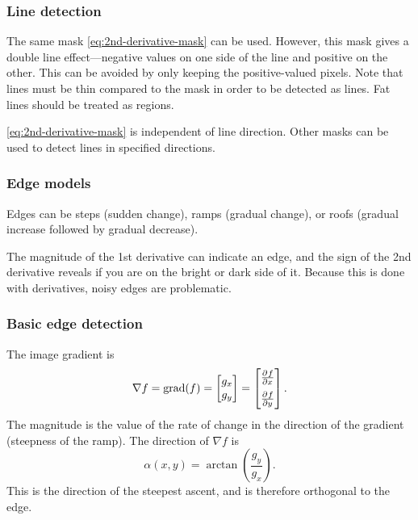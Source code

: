 \subsubsection{Line detection}
The same mask \eqref{eq:2nd-derivative-mask} can be used. However, this mask gives a double line effect---negative values on one side of the line and positive on the other. This can be avoided by only keeping the positive-valued pixels. Note that lines must be thin compared to the mask in order to be detected as lines. Fat lines should be treated as regions.

\eqref{eq:2nd-derivative-mask} is independent of line direction. Other masks can be used to detect lines in specified directions.

\subsubsection{Edge models}
Edges can be steps (sudden change), ramps (gradual change), or roofs (gradual increase followed by gradual decrease).

The magnitude of the 1st derivative can indicate an edge, and the sign of the 2nd derivative reveals if you are on the bright or dark side of it. Because this is done with derivatives, noisy edges are problematic.

\subsubsection{Basic edge detection}\label{sssec:edge-detection}
The image gradient is
\begin{equation}
    \nabla f = \mathrm{grad}(f)
    =
    \begin{bmatrix} g_x \\ g_y \end{bmatrix}
    =
    \begin{bmatrix} \pd{f}{x} \\[6pt] \pd{f}{y} \end{bmatrix}.
\end{equation}
The magnitude is the value of the rate of change in the direction of the gradient (steepness of the ramp). The direction of $\nabla f$ is
\begin{equation}
    \alpha(x,y) = \arctan \left( \frac{g_y}{g_x} \right).
\end{equation}
This is the direction of the steepest ascent, and is therefore orthogonal to the edge.


